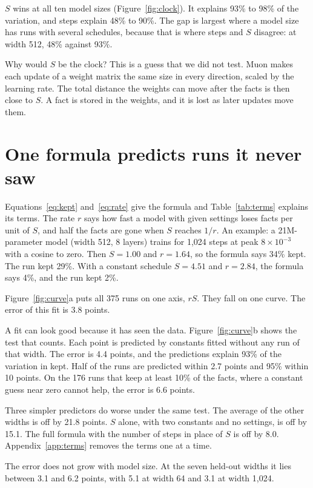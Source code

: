 \documentclass{article}
\begin{document}
$S$ wins at all ten model sizes (Figure~\ref{fig:clock}). It explains 93\% to 98\% of the variation, and steps explain 48\% to 90\%. The gap is largest where a model size has runs with several schedules, because that is where steps and $S$ disagree: at width 512, 48\% against 93\%.

Why would $S$ be the clock? This is a guess that we did not test. Muon makes each update of a weight matrix the same size in every direction, scaled by the learning rate. The total distance the weights can move after the facts is then close to $S$. A fact is stored in the weights, and it is lost as later updates move them.

\section{One formula predicts runs it never saw}
\label{sec:formula}

Equations~\ref{eq:kept} and~\ref{eq:rate} give the formula and Table~\ref{tab:terms} explains its terms. The rate $r$ says how fast a model with given settings loses facts per unit of $S$, and half the facts are gone when $S$ reaches $1/r$. An example: a 21M-parameter model (width 512, 8 layers) trains for 1,024 steps at peak $8\times10^{-3}$ with a cosine to zero. Then $S = 1.00$ and $r = 1.64$, so the formula says 34\% kept. The run kept 29\%. With a constant schedule $S = 4.51$ and $r = 2.84$, the formula says 4\%, and the run kept 2\%.

Figure~\ref{fig:curve}a puts all 375 runs on one axis, $rS$. They fall on one curve. The error of this fit is 3.8 points.

A fit can look good because it has seen the data. Figure~\ref{fig:curve}b shows the test that counts. Each point is predicted by constants fitted without any run of that width. The error is 4.4 points, and the predictions explain 93\% of the variation in kept. Half of the runs are predicted within 2.7 points and 95\% within 10 points. On the 176 runs that keep at least 10\% of the facts, where a constant guess near zero cannot help, the error is 6.6 points.

Three simpler predictors do worse under the same test. The average of the other widths is off by 21.8 points. $S$ alone, with two constants and no settings, is off by 15.1. The full formula with the number of steps in place of $S$ is off by 8.0. Appendix~\ref{app:terms} removes the terms one at a time.

The error does not grow with model size. At the seven held-out widths it lies between 3.1 and 6.2 points, with 5.1 at width 64 and 3.1 at width 1,024.
\end{document}
